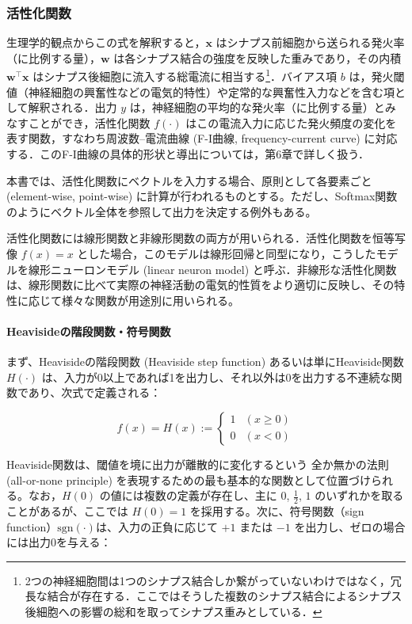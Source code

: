 \documentclass[titlepage]{ltjsbook}
\begin{document}
\subsubsection{活性化関数}
生理学的観点からこの式を解釈すると，$\mathbf{x}$ はシナプス前細胞から送られる発火率（に比例する量），$\mathbf{w}$ は各シナプス結合の強度を反映した重みであり，その内積 $\mathbf{w}^\top \mathbf{x}$ はシナプス後細胞に流入する総電流に相当する\footnote{2つの神経細胞間は1つのシナプス結合しか繋がっていないわけではなく，冗長な結合が存在する．ここではそうした複数のシナプス結合によるシナプス後細胞への影響の総和を取ってシナプス重みとしている．}．バイアス項 $b$ は，発火閾値（神経細胞の興奮性などの電気的特性）や定常的な興奮性入力などを含む項として解釈される．出力 $y$ は，神経細胞の平均的な発火率（に比例する量）とみなすことができ，活性化関数 $f(\cdot)$ はこの電流入力に応じた発火頻度の変化を表す関数，すなわち周波数–電流曲線 (F-I曲線, frequency-current curve) に対応する．このF-I曲線の具体的形状と導出については，第6章で詳しく扱う．

本書では、活性化関数にベクトルを入力する場合、原則として各要素ごと (element-wise, point-wise) に計算が行われるものとする。ただし、Softmax関数のようにベクトル全体を参照して出力を決定する例外もある。

活性化関数には線形関数と非線形関数の両方が用いられる．活性化関数を恒等写像 $f(x) = x$ とした場合，このモデルは線形回帰と同型になり，こうしたモデルを線形ニューロンモデル (linear neuron model) と呼ぶ．非線形な活性化関数は、線形関数に比べて実際の神経活動の電気的性質をより適切に反映し、その特性に応じて様々な関数が用途別に用いられる。

\paragraph{Heavisideの階段関数・符号関数}
まず、Heavisideの階段関数 (Heaviside step function) あるいは単にHeaviside関数 $H(\cdot)$ は、入力が0以上であれば1を出力し、それ以外は0を出力する不連続な関数であり、次式で定義される：

\begin{equation}
f(x) = H(x):=
\begin{cases}
1 & (x \geq 0) \\
0 & (x < 0)
\end{cases}
\end{equation}

Heaviside関数は、閾値を境に出力が離散的に変化するという 全か無かの法則 (all-or-none principle) を表現するための最も基本的な関数として位置づけられる。なお，$H(0)$ の値には複数の定義が存在し、主に $0$, $\frac{1}{2}$, $1$ のいずれかを取ることがあるが、ここでは $H(0) = 1$ を採用する。次に、符号関数（sign function）$\mathrm{sgn}(\cdot)$は、入力の正負に応じて $+1$ または $-1$ を出力し、ゼロの場合には出力0を与える：
\end{document}

